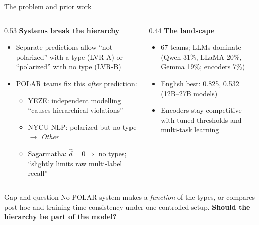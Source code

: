\begin{frame}{The problem and prior work}
\begin{columns}[T]
\begin{column}{0.53\textwidth}
\textbf{Systems break the hierarchy}
\begin{itemize}\footnotesize
\item Separate predictions allow ``not polarized'' with a type (LVR-A) or
  ``polarized'' with no type (LVR-B)
\item POLAR teams fix this \emph{after} prediction:
  \begin{itemize}\footnotesize
  \item YEZE: independent modelling ``causes hierarchical violations''
  \item NYCU-NLP: polarized but no type $\to$ \emph{Other}
  \item Sagarmatha: $\hat d = 0 \Rightarrow$ no types; ``slightly limits raw
    multi-label recall''
  \end{itemize}
\end{itemize}
\end{column}
\begin{column}{0.44\textwidth}
\textbf{The landscape}
\begin{itemize}\footnotesize
\item 67 teams; LLMs dominate (Qwen 31\%, LLaMA 20\%, Gemma 19\%; encoders 7\%)
\item English best: \DET{} 0.825, \TYPE{} 0.532 (12B--27B models)
\item Encoders stay competitive with tuned thresholds and multi-task learning
\end{itemize}
\end{column}
\end{columns}
\vspace{2pt}
\begin{alertblock}{Gap and question}
\small No POLAR system makes \DET{} a \emph{function} of the types, or compares post-hoc
and training-time consistency under one controlled setup.
\textbf{Should the hierarchy be part of the model?}
\end{alertblock}
\end{frame}


